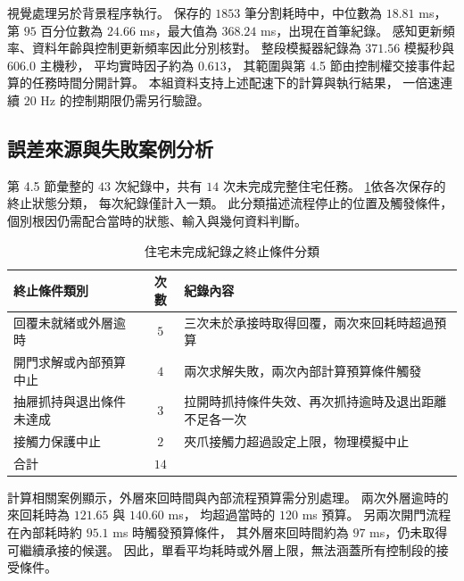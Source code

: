 視覺處理另於背景程序執行。
保存的 $1853$ 筆分割耗時中，中位數為 $18.81$ ms，
第 $95$ 百分位數為 $24.66$ ms，最大值為 $368.24$ ms，出現在首筆紀錄。
感知更新頻率、資料年齡與控制更新頻率因此分別核對。
整段模擬器紀錄為 $371.56$ 模擬秒與 $606.0$ 主機秒，
平均實時因子約為 $0.613$，
其範圍與第 4.5 節由控制權交接事件起算的任務時間分開計算。
本組資料支持上述配速下的計算與執行結果，
一倍速連續 $20$ Hz 的控制期限仍需另行驗證。

\subsection{誤差來源與失敗案例分析}
\label{subsec:error_sources_failure_analysis}

第 4.5 節彙整的 $43$ 次紀錄中，共有 $14$ 次未完成完整住宅任務。
\cref{tab:ch4_residential_failure_categories}依各次保存的終止狀態分類，
每次紀錄僅計入一類。
此分類描述流程停止的位置及觸發條件，
個別根因仍需配合當時的狀態、輸入與幾何資料判斷。

\begin{table}[htbp]
    \centering
    \caption{住宅未完成紀錄之終止條件分類}
    \label{tab:ch4_residential_failure_categories}
    \begingroup
    \small
    \renewcommand{\arraystretch}{1.25}
    \begin{tabular}{p{} c p{}}
        \hline
        終止條件類別 & 次數 & 紀錄內容 \\
        \hline
        回覆未就緒或外層逾時 & $5$
        & 三次未於承接時取得回覆，兩次來回耗時超過預算 \\
        開門求解或內部預算中止 & $4$
        & 兩次求解失敗，兩次內部計算預算條件觸發 \\
        抽屜抓持與退出條件未達成 & $3$
        & 拉開時抓持條件失效、再次抓持逾時及退出距離不足各一次 \\
        接觸力保護中止 & $2$
        & 夾爪接觸力超過設定上限，物理模擬中止 \\
        \hline
        合計 & $14$ & \\
        \hline
    \end{tabular}
    \endgroup
\end{table}

計算相關案例顯示，外層來回時間與內部流程預算需分別處理。
兩次外層逾時的來回耗時為 $121.65$ 與 $140.60$ ms，
均超過當時的 $120$ ms 預算。
另兩次開門流程在內部耗時約 $95.1$ ms 時觸發預算條件，
其外層來回時間約為 $97$ ms，仍未取得可繼續承接的候選。
因此，單看平均耗時或外層上限，無法涵蓋所有控制段的接受條件。

